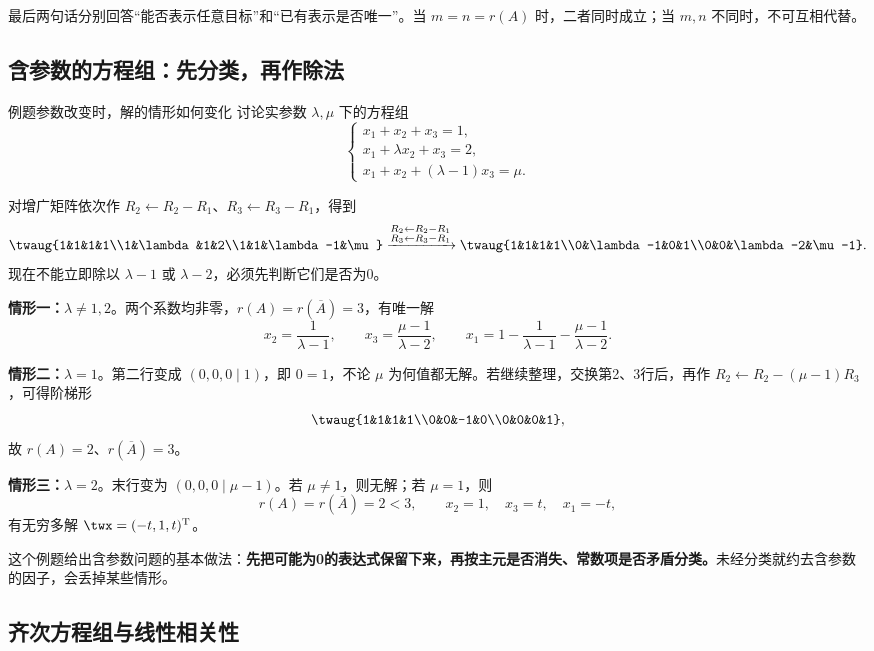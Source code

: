 \documentclass[a4paper,12pt,twoside,openany,fontset=none]{ctexbook}
\newcommand{\R}{\mathbb{R}}
\newcounter{example}[chapter]
\newenvironment{example}[1][]{\begin{exBox}{例题}{#1}}{\end{exBox}}
\numberwithin{equation}{chapter}
\begin{document}
最后两句话分别回答“能否表示任意目标”和“已有表示是否唯一”。当 $m=n=r(A)$ 时，二者同时成立；当 $m,n$ 不同时，不可互相代替。

\subsection*{含参数的方程组：先分类，再作除法}

\begin{example}[参数改变时，解的情形如何变化]
讨论实参数 $\lambda,\mu$ 下的方程组
\[
    \begin{cases}
    x_1+x_2+x_3=1,\\
    x_1+\lambda x_2+x_3=2,\\
    x_1+x_2+(\lambda-1)x_3=\mu.
    \end{cases}
\]
\end{example}

对增广矩阵依次作 $R_2\leftarrow R_2-R_1$、$R_3\leftarrow R_3-R_1$，得到
\[
 \twaug{1&1&1&1\\1&\lambda&1&2\\1&1&\lambda-1&\mu}
 \xrightarrow{\substack{R_2\leftarrow R_2-R_1\\R_3\leftarrow R_3-R_1}}
 \twaug{1&1&1&1\\0&\lambda-1&0&1\\0&0&\lambda-2&\mu-1}.
\]
现在不能立即除以 $\lambda-1$ 或 $\lambda-2$，必须先判断它们是否为0。

\textbf{情形一：}$\lambda\ne1,2$。两个系数均非零，$r(A)=r(\overline A)=3$，有唯一解
\[
    x_2=\frac1{\lambda-1},\qquad
    x_3=\frac{\mu-1}{\lambda-2},\qquad
    x_1=1-\frac1{\lambda-1}-\frac{\mu-1}{\lambda-2}.
\]

\textbf{情形二：}$\lambda=1$。第二行变成 $(0,0,0\mid1)$，即 $0=1$，不论 $\mu$ 为何值都无解。若继续整理，交换第2、3行后，再作 $R_2\leftarrow R_2-(\mu-1)R_3$，可得阶梯形
\[
    \twaug{1&1&1&1\\0&0&-1&0\\0&0&0&1},
\]
故 $r(A)=2$、$r(\overline A)=3$。

\textbf{情形三：}$\lambda=2$。末行变为 $(0,0,0\mid\mu-1)$。若 $\mu\ne1$，则无解；若 $\mu=1$，则
\[
    r(A)=r(\overline A)=2<3,
    \qquad x_2=1,\quad x_3=t,\quad x_1=-t,
\]
有无穷多解 $\twx=(-t,1,t)^{\mathrm T}$。

这个例题给出含参数问题的基本做法：\textbf{先把可能为0的表达式保留下来，再按主元是否消失、常数项是否矛盾分类。}未经分类就约去含参数的因子，会丢掉某些情形。

\subsection*{齐次方程组与线性相关性}
\end{document}
